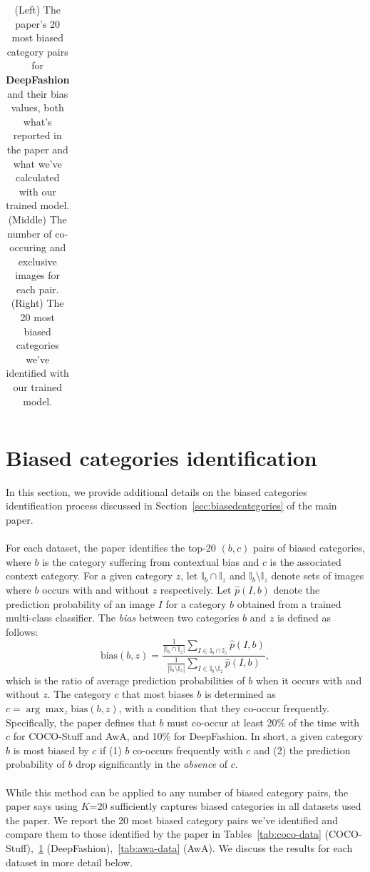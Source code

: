 \begin{table}[bh!]
{\begin{tabular}{|cc|cc|cc|cc||ccc|}
\hline
\end{tabular}
}
\vspace{0.1cm}
\caption{(Left) The paper's 20 most biased category pairs for \textbf{DeepFashion} and their bias values, both what's reported in the paper and what we've calculated with our trained model. (Middle) The number of co-occuring and exclusive images for each pair. (Right) The 20 most biased categories we've identified with our trained model.}
\label{tab:deepfashion-data}
\end{table}



\section{Biased categories identification}
\label{sec:biasedcategoriesapp}

In this section, we provide additional details on the biased categories identification process discussed in Section~\ref{sec:biasedcategories} of the main paper.\\
\\
For each dataset, the paper identifies the top-20 $(b, c)$ pairs of biased categories, where $b$ is the category suffering from contextual bias and $c$ is the associated context category. For a given category $z$, let $\mathbb{I}_b \cap \mathbb{I}_z$ and $\mathbb{I}_b \setminus \mathbb{I}_z$ denote sets of images where $b$ occurs with and without $z$ respectively. Let $\hat{p}(I, b)$ denote the prediction probability of an image $I$ for a category $b$ obtained from a trained multi-class classifier. The \textit{bias} between two categories $b$ and $z$ is defined as follows:
\begin{equation}
    \text{bias}(b,z)=\frac{\frac{1}{|\mathbb{I}_b \cap \mathbb{I}_z|} \sum_{I\in \mathbb{I}_b \cap \mathbb{I}_z} \hat{p}(I,b)}{\frac{1}{|\mathbb{I}_b \setminus \mathbb{I}_z|} \sum_{I\in \mathbb{I}_b \setminus \mathbb{I}_z} \hat{p}(I,b)},
\end{equation}
which is the ratio of average prediction probabilities of $b$ when it occurs with and without $z$. The category $c$ that most biases $b$ is determined as $c = \arg \max_z \text{bias}(b, z)$, with a condition that they co-occur frequently. Specifically, the paper defines that $b$ must co-occur at least 20\% of the time with $c$ for COCO-Stuff and AwA, and 10\% for DeepFashion. 
In short, a given category $b$ is most biased by $c$ if (1) $b$ co-occurs frequently with $c$ and (2) the prediction probability of $b$ drop significantly in the \textit{absence} of $c$.\\
\\
While this method can be applied to any number of biased category pairs, the paper says using $K$=20 sufficiently captures biased categories in all datasets used the paper. 
We report the 20 most biased category pairs we've identified and compare them to those identified by the paper in Tables~\ref{tab:coco-data} (COCO-Stuff),~\ref{tab:deepfashion-data} (DeepFashion),~\ref{tab:awa-data} (AwA). We discuss the results for each dataset in more detail below.\\

